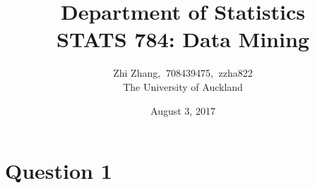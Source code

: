 \documentclass{article}%
\begin{document}
\title{Department of  Statistics \\ STATS 784: Data Mining}
\author{Zhi Zhang, $\ $708439475, $\ $zzha822
\\The University of Auckland}
\date{August 3, 2017}
\maketitle


\section{Question 1}
\end{document}
